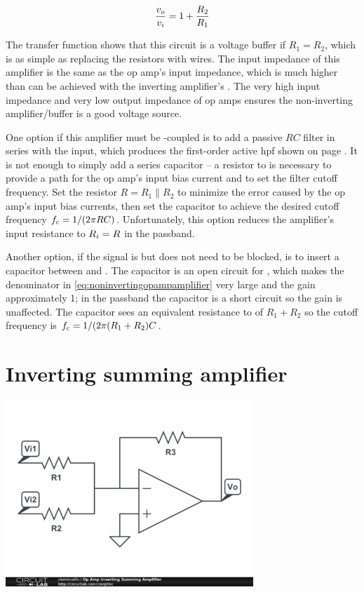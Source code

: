 \textcolor{red}{
\begin{equation}
	\frac{\vout}{\vin} = 1+\frac{R_2}{R_1}
	\label{eq:noninvertingopampamplifier}
\end{equation}
}

The transfer function shows that this circuit is a voltage buffer if \(R_1 = R_2\), which is as simple as replacing the resistors with wires.
The input impedance of this amplifier is the same as the op amp's input impedance, which is much higher than can be achieved with the inverting amplifier's \rin.
The very high input impedance and very low output impedance of op amps ensures the non-inverting amplifier/buffer is a good voltage source.

One option if this amplifier must be \AC-coupled is to add a passive \(RC\) filter in series with the input, which produces the first-order active \ac{hpf} shown on page \pageref{sec:active1storderHPF}.
It is not enough to simply add a series capacitor -- a resistor to \gnd is necessary to provide a \DC path for the op amp's input bias current and to set the filter cutoff frequency.
Set the resistor \(R = R_1 \parallel R_2\) to minimize the error caused by the op amp's input bias currents, then set the capacitor \C to achieve the desired cutoff frequency \(f_\mathrm{c} = 1/(2\pi R C)\).
Unfortunately, this option reduces the amplifier's input resistance to \(R_i = R\) in the passband.

Another option, if the signal is \AC but \DC does not need to be blocked, is to insert a capacitor \C between \R[1] and \gnd.
The capacitor is an open circuit for \DC, which makes the denominator in \eqref{eq:noninvertingopampamplifier} very large and the \DC gain approximately 1;
in the passband the capacitor is a short circuit so the gain is unaffected.
The capacitor sees an equivalent resistance to \gnd of \(R_1 + R_2\) so the cutoff frequency is \(f_\mathrm{c} = 1/(2\pi(R_1 + R_2)C\).

\section{Inverting summing amplifier}
\begin{center}
	\includegraphics[width=0.70\textwidth]{schematics/invsummingamp.PNG}
\end{center}

